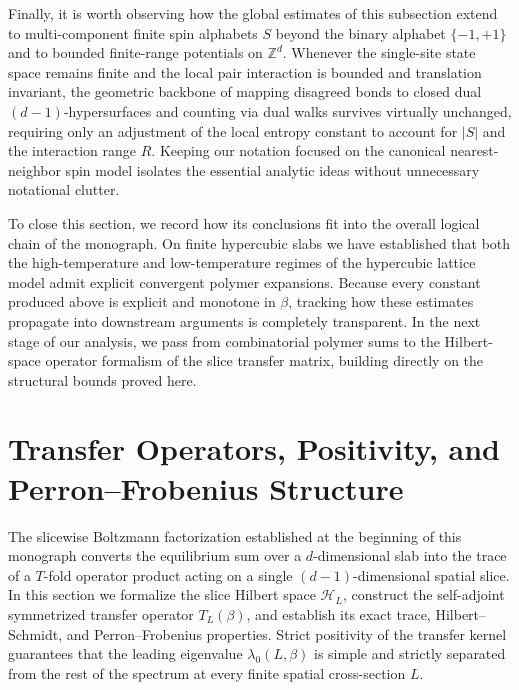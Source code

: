 \documentclass[11pt]{article}
\theoremstyle{definition}
\begin{document}
Finally, it is worth observing how the global estimates of this subsection extend to
multi-component finite spin alphabets $S$ beyond the binary alphabet $\{-1, +1\}$
and to bounded finite-range potentials on $\mathbb{Z}^d$. Whenever the single-site
state space remains finite and the local pair interaction is bounded and translation
invariant, the geometric backbone of mapping disagreed bonds to closed dual
$(d-1)$-hypersurfaces and counting via dual walks survives virtually unchanged,
requiring only an adjustment of the local entropy constant to account for $|S|$ and
the interaction range $R$. Keeping our notation focused on the canonical
nearest-neighbor spin model isolates the essential analytic ideas without
unnecessary notational clutter.

To close this section, we record how its conclusions fit into the overall logical
chain of the monograph. On finite hypercubic slabs we have established that both the
high-temperature and low-temperature regimes of the hypercubic lattice model admit
explicit convergent polymer expansions. Because every constant produced above is
explicit and monotone in $\beta$, tracking how these estimates propagate into
downstream arguments is completely transparent. In the next stage of our analysis,
we pass from combinatorial polymer sums to the Hilbert-space operator formalism of
the slice transfer matrix, building directly on the structural bounds proved here.

\section{Transfer Operators, Positivity, and Perron--Frobenius Structure}
\label{sec:s05}

The slicewise Boltzmann factorization established at the beginning of this monograph
converts the equilibrium sum over a $d$-dimensional slab into the trace of a
$T$-fold operator product acting on a single $(d-1)$-dimensional spatial slice. In
this section we formalize the slice Hilbert space $\mathcal{H}_L$, construct the
self-adjoint symmetrized transfer operator $T_L(\beta)$, and establish its exact
trace, Hilbert--Schmidt, and Perron--Frobenius properties. Strict positivity of the
transfer kernel guarantees that the leading eigenvalue $\lambda_0(L, \beta)$ is
simple and strictly separated from the rest of the spectrum at every finite spatial
cross-section $L$.
\end{document}
